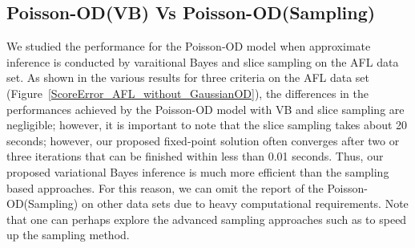 \subsection{Poisson-OD(VB) Vs Poisson-OD(Sampling)}
\label{sec:VBSampling}
We studied the performance for the Poisson-OD model when approximate inference is conducted by varaitional Bayes and slice sampling on the AFL data set. As shown in the various results for three criteria on the AFL data set (Figure~\ref{ScoreError_AFL_without_GaussianOD}), the differences in the performances achieved by the Poisson-OD model with VB and slice sampling are negligible; however, it is important to note that the slice sampling takes about 20 seconds; however, our proposed fixed-point solution often converges after two or three iterations that can be finished within less  than 0.01 seconds. Thus, our proposed variational Bayes inference is much more efficient than the sampling based approaches. For this reason, we can omit the report of the Poisson-OD(Sampling) on other data sets due to heavy computational requirements. Note that one can perhaps explore the advanced sampling approaches such as \cite{Murray:AISTATS2010} to speed up the sampling method. 


